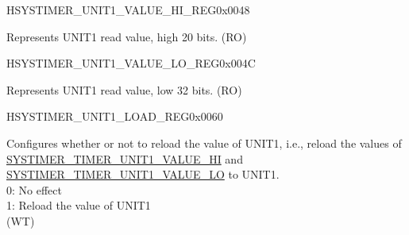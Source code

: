 \begin{register}{H}{SYSTIMER\_UNIT1\_VALUE\_HI\_REG}{0x0048}\label{regdesc:SYSTIMERUNIT1VALUEHIREG}
%
%
\regnewline%
\begin{regdesc}\begin{reglist}
\label{fielddesc:SYSTIMERTIMERUNIT1VALUEHI}\item [SYSTIMER\_TIMER\_UNIT1\_VALUE\_HI] Represents UNIT1 read value, high 20 bits. (RO)
\end{reglist}\end{regdesc}
\end{register}


\begin{register}{H}{SYSTIMER\_UNIT1\_VALUE\_LO\_REG}{0x004C}\label{regdesc:SYSTIMERUNIT1VALUELOREG}
%
\regnewline%
\begin{regdesc}\begin{reglist}
\label{fielddesc:SYSTIMERTIMERUNIT1VALUELO}\item [SYSTIMER\_TIMER\_UNIT1\_VALUE\_LO] Represents UNIT1 read value, low 32 bits. (RO)
\end{reglist}\end{regdesc}
\end{register}


\begin{register}{H}{SYSTIMER\_UNIT1\_LOAD\_REG}{0x0060}\label{regdesc:SYSTIMERUNIT1LOADREG}
%
%
\regnewline%
\begin{regdesc}\begin{reglist}
\label{fielddesc:SYSTIMERTIMERUNIT1LOAD}\item [SYSTIMER\_TIMER\_UNIT1\_LOAD] Configures whether or not to reload the value of UNIT1, i.e., reload the values of \hyperref[fielddesc:SYSTIMERTIMERUNIT0VALUEHI]{SYSTIMER\_TIMER\_UNIT1\_VALUE\_HI} and \hyperref[fielddesc:SYSTIMERTIMERUNIT0VALUELO]{SYSTIMER\_TIMER\_UNIT1\_VALUE\_LO} to UNIT1. \\
0: No effect \\
1: Reload the value of UNIT1\\
(WT)
\end{reglist}\end{regdesc}
\end{register}



